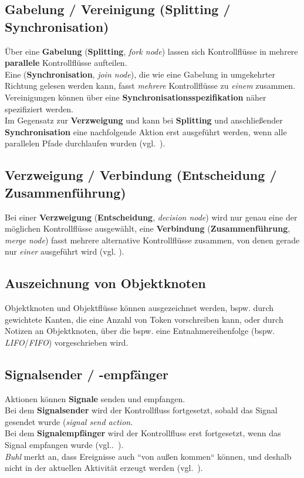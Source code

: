 \subsection{Gabelung / Vereinigung (Splitting / Synchronisation)}
Über eine \textbf{Gabelung} (\textbf{Splitting}, \textit{fork node}) lassen sich Kontrollflüsse in mehrere \textbf{parallele} Kontrollflüsse aufteilen.\\

\noindent
Eine  (\textbf{Synchronisation}, \textit{join node}), die wie eine Gabelung in umgekehrter Richtung gelesen werden kann, fasst \textit{mehrere} Kontrollflüsse zu \textit{einem} zusammen.\\
Vereinigungen können über eine \textbf{Synchronisationsspezifikation} näher spezifiziert werden.\\

\noindent
Im Gegensatz zur \textbf{Verzweigung} und  kann bei \textbf{Splitting} und anschließender \textbf{Synchronisation} eine nachfolgende Aktion erst ausgeführt werden, wenn alle parallelen Pfade durchlaufen wurden (vgl.~\cite[71]{Bal05}).

\subsection{Verzweigung / Verbindung (Entscheidung / Zusammenführung)}
Bei einer \textbf{Verzweigung} (\textbf{Entscheidung}, \textit{decision node}) wird nur genau eine der möglichen Kontrollflüsse ausgewählt, eine \textbf{Verbindung} (\textbf{Zusammenführung}, \textit{merge node}) fasst mehrere alternative  Kontrollflüsse zusammen, von denen gerade nur \textit{einer} ausgeführt wird (vgl. \cite[60]{Buh09}).

\subsection{Auszeichnung von Objektknoten}
Objektknoten und Objektflüsse können ausgezeichnet werden, bspw. durch gewichtete Kanten, die eine Anzahl von Token vorschreiben kann, oder durch Notizen an Objektknoten, über die bspw. eine Entnahmereihenfolge (bspw. \textit{LIFO}/\textit{FIFO}) vorgeschrieben wird.

\subsection{Signalsender / -empfänger}
Aktionen können \textbf{Signale} senden und empfangen.\\
Bei dem \textbf{Signalsender} wird der Kontrollfluss fortgesetzt, sobald das Signal gesendet wurde (\textit{signal send action}. \\
Bei dem \textbf{Signalempfänger} wird der Kontrollfluss erst fortgesetzt, wenn das Signal empfangen wurde (vgl..~\cite[76]{Bal05}).\\
\textit{Buhl} merkt an, dass Ereignisse auch ``von außen kommen`` können, und deshalb nicht in der aktuellen Aktivität erzeugt werden (vgl.~\cite[63]{Buh09}).


